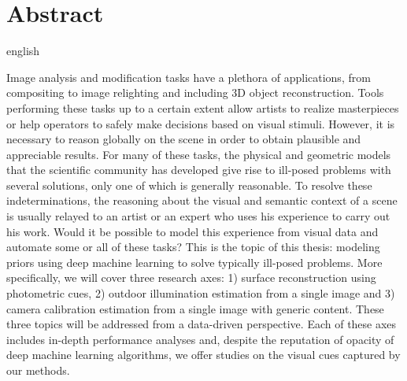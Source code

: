 \chapter*{Abstract}                      %

\begin{otherlanguage*}{english}

  Image analysis and modification tasks have a plethora of applications, from compositing to image relighting and including 3D object reconstruction. Tools performing these tasks up to a certain extent allow artists to realize masterpieces or help operators to safely make decisions based on visual stimuli. However, it is necessary to reason globally on the scene in order to obtain plausible and appreciable results. For many of these tasks, the physical and geometric models that the scientific community has developed give rise to ill-posed problems with several solutions, only one of which is generally reasonable. To resolve these indeterminations, the reasoning about the visual and semantic context of a scene is usually relayed to an artist or an expert who uses his experience to carry out his work. Would it be possible to model this experience from visual data and automate some or all of these tasks? This is the topic of this thesis: modeling priors using deep machine learning to solve typically ill-posed problems. More specifically, we will cover three research axes: 1) surface reconstruction using photometric cues, 2) outdoor illumination estimation from a single image and 3) camera calibration estimation from a single image with generic content. These three topics will be addressed from a data-driven perspective. Each of these axes includes in-depth performance analyses and, despite the reputation of opacity of deep machine learning algorithms, we offer studies on the visual cues captured by our methods. 

\end{otherlanguage*}
